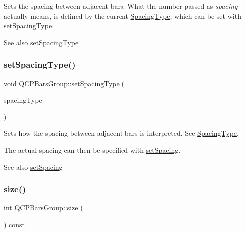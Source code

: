 Sets the spacing between adjacent bars. What the number passed as {\itshape spacing} actually means, is defined by the current \mbox{\hyperlink{class_q_c_p_bars_group_a4c0521120a97e60bbca37677a37075b6}{Spacing\+Type}}, which can be set with \mbox{\hyperlink{class_q_c_p_bars_group_a2c7e2d61b10594a4555b615e1fcaf49e}{set\+Spacing\+Type}}.

\begin{DoxySeeAlso}{See also}
\mbox{\hyperlink{class_q_c_p_bars_group_a2c7e2d61b10594a4555b615e1fcaf49e}{set\+Spacing\+Type}} 
\end{DoxySeeAlso}
\mbox{\label{class_q_c_p_bars_group_a2c7e2d61b10594a4555b615e1fcaf49e}} 
\subsubsection{\texorpdfstring{setSpacingType()}{setSpacingType()}}
{\footnotesize\ttfamily void Q\+C\+P\+Bars\+Group\+::set\+Spacing\+Type (\begin{DoxyParamCaption}\item[{\mbox{\hyperlink{class_q_c_p_bars_group_a4c0521120a97e60bbca37677a37075b6}{Spacing\+Type}}}]{spacing\+Type }\end{DoxyParamCaption})}

Sets how the spacing between adjacent bars is interpreted. See \mbox{\hyperlink{class_q_c_p_bars_group_a4c0521120a97e60bbca37677a37075b6}{Spacing\+Type}}.

The actual spacing can then be specified with \mbox{\hyperlink{class_q_c_p_bars_group_aa553d327479d72a0c3dafcc724a190e2}{set\+Spacing}}.

\begin{DoxySeeAlso}{See also}
\mbox{\hyperlink{class_q_c_p_bars_group_aa553d327479d72a0c3dafcc724a190e2}{set\+Spacing}} 
\end{DoxySeeAlso}
\mbox{\label{class_q_c_p_bars_group_a3780ec77919cb00840207ec7a0f00dd5}} 
\subsubsection{\texorpdfstring{size()}{size()}}
{\footnotesize\ttfamily int Q\+C\+P\+Bars\+Group\+::size (\begin{DoxyParamCaption}{ }\end{DoxyParamCaption}) const\hspace{0.3cm}{\ttfamily [inline]}}


